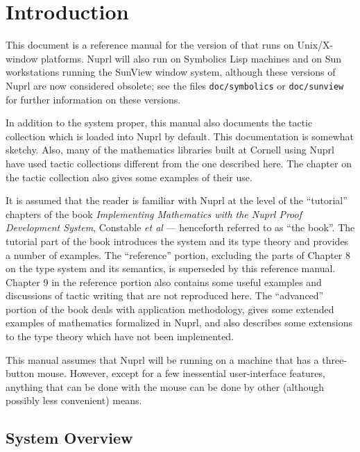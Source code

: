 \chapter{Introduction}

This document is a reference manual for the version of \Nuprl{}
that runs on Unix/X-window platforms.  Nuprl will also run on 
Symbolics Lisp machines and on Sun workstations running the SunView
window system, although these versions of Nuprl are now considered
obsolete; see the files {\tt doc/symbolics} or {\tt doc/sunview} for
further information on these versions.

In addition to the system proper, this manual also documents the
tactic collection which is loaded into Nuprl by default.  This
documentation is somewhat sketchy.  Also, many of the mathematics
libraries built at Cornell using Nuprl have used tactic collections
different from the one described here.  The chapter on the tactic
collection also gives some examples of their use.

It is assumed that the reader is familiar with Nuprl at the level of
the ``tutorial'' chapters of the book {\em Implementing Mathematics
with the Nuprl Proof Development System}, Constable {\em et al} ---
henceforth referred to as ``the book''.  The tutorial part of the book
introduces the system and its type theory and provides a number of
examples.  The ``reference'' portion, excluding the parts of Chapter 8
on the type system and its semantics, is superseded by this reference
manual.  Chapter 9 in the reference portion also contains some useful
examples and discussions of tactic writing that are not reproduced
here.  The ``advanced'' portion of the book deals with application
methodology, gives some extended examples of mathematics formalized
in Nuprl, and also describes some extensions to the type theory which
have not been implemented.

This manual assumes that Nuprl will be running on a machine that has a
three-button mouse.  However, except for a few inessential
user-interface features, anything that can be done with the mouse can
be done by other (although possibly less convenient) means.

\section{System Overview}

\label{Overview}

